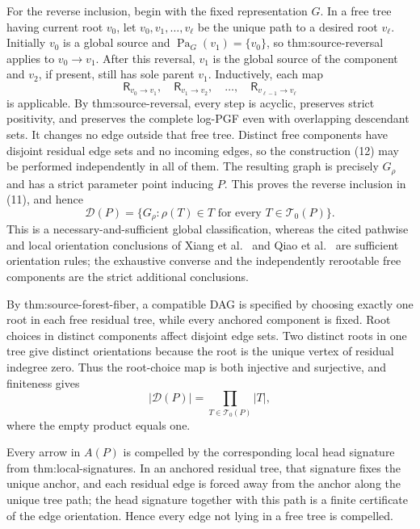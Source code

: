 For the reverse inclusion, begin with the fixed representation \(G\).  In a free tree having current root \(v_0\), let \(v_0,v_1,\ldots,v_\ell\) be the unique path to a desired root \(v_\ell\).  Initially \(v_0\) is a global source and \(\operatorname{Pa}_G(v_1)=\{v_0\}\), so thm:source-reversal applies to \(v_0\to v_1\).  After this reversal, \(v_1\) is the global source of the component and \(v_2\), if present, still has sole parent \(v_1\).  Inductively, each map
\[
 \mathsf R_{v_0\to v_1},\quad
 \mathsf R_{v_1\to v_2},\quad\ldots,\quad
 \mathsf R_{v_{\ell-1}\to v_\ell}
\tag{12}
\]
is applicable.  By thm:source-reversal, every step is acyclic, preserves strict positivity, and preserves the complete log-PGF even with overlapping descendant sets.  It changes no edge outside that free tree.  Distinct free components have disjoint residual edge sets and no incoming edges, so the construction (12) may be performed independently in all of them.  The resulting graph is precisely \(G_\rho\) and has a strict parameter point inducing \(P\).  This proves the reverse inclusion in (11), and hence
\[
 \mathcal D(P)=
 \{G_\rho:\rho(T)\in T\text{ for every }T\in\mathcal T_0(P)\}.
\]
This is a necessary-and-sufficient global classification, whereas the cited pathwise and local orientation conclusions of Xiang et al.\ \cite[Theorem~7]{xiang2024identifiability} and Qiao et al.\ \cite[Theorem~7]{qiao2024causal} are sufficient orientation rules; the exhaustive converse and the independently rerootable free components are the strict additional conclusions.

By thm:source-forest-fiber, a compatible DAG is specified by choosing exactly one root in each free residual tree, while every anchored component is fixed.  Root choices in distinct components affect disjoint edge sets.  Two distinct roots in one tree give distinct orientations because the root is the unique vertex of residual indegree zero.  Thus the root-choice map is both injective and surjective, and finiteness gives
\[
 |\mathcal D(P)|=\prod_{T\in\mathcal T_0(P)}|T|,
\]
where the empty product equals one.

Every arrow in \(A(P)\) is compelled by the corresponding local head signature from thm:local-signatures.  In an anchored residual tree, that signature fixes the unique anchor, and each residual edge is forced away from the anchor along the unique tree path; the head signature together with this path is a finite certificate of the edge orientation.  Hence every edge not lying in a free tree is compelled.

